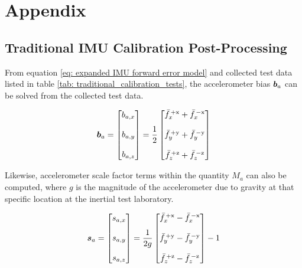 
\begingroup
\allowdisplaybreaks

\section{Appendix}

\subsection{Traditional IMU Calibration Post-Processing} \label{sec: traditional imu calibration post-processing}

From equation \ref{eq: expanded IMU forward error model} and collected test data listed in table \ref{tab: traditional_calibration_tests}, the accelerometer bias $\boldsymbol{b}_a$ can be solved from the collected test data.

\begin{align} \label{eq: traditional accel bias computation}
	\boldsymbol{b}_a = \begin{bmatrix} b_{a,x} \\ \\ b_{a,y} \\ \\ b_{a,z} \end{bmatrix} = \frac{1}{2} \begin{bmatrix}
		\bar{f}^{\,+\textrm{x}}_{x} + \bar{f}^{\,-\textrm{x}}_{x} \\
		\\
		\bar{f}^{\,+\textrm{y}}_{y} + \bar{f}^{\,-\textrm{y}}_{y} \\
		\\
		\bar{f}^{\,+\textrm{z}}_{z} + \bar{f}^{\,-\textrm{z}}_{z}
	\end{bmatrix}
\end{align}

Likewise, accelerometer scale factor terms within the quantity $M_a$ can also be computed, where $g$ is the magnitude of the accelerometer due to gravity at that specific location at the inertial test laboratory.

\begin{align} \label{eq: traditional accel scale factor computation}
	\boldsymbol{s}_a = \begin{bmatrix} s_{a,x} \\ \\ s_{a,y} \\ \\ s_{a,z} \end{bmatrix} = \frac{1}{2g} \begin{bmatrix}
		\bar{f}^{\,+\textrm{x}}_{x} - \bar{f}^{\,-\textrm{x}}_{x} \\
		\\
		\bar{f}^{\,+\textrm{y}}_{y} - \bar{f}^{\,-\textrm{y}}_{y} \\
		\\
		\bar{f}^{\,+\textrm{z}}_{z} - \bar{f}^{\,-\textrm{z}}_{z}
	\end{bmatrix} - 1
\end{align}

